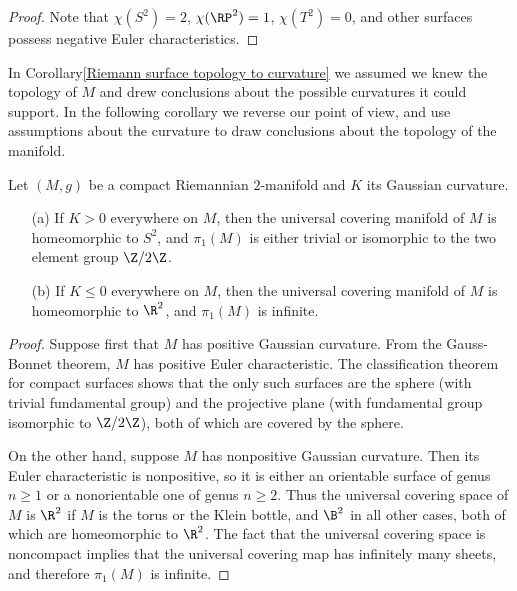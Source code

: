 \begin{proof}
Note that $\chi(S^2)=2$, $\chi(\RP^2)=1$, $\chi(T^2)=0$, and other surfaces possess negative Euler characteristics.
\end{proof}
In Corollary\ref{Riemann surface topology to curvature} we assumed we knew the topology of $M$ and drew conclusions about the possible curvatures it could support. In the following corollary we reverse our 
point of view, and use assumptions about the curvature to draw conclusions about the topology of the manifold.
\begin{corollary}\label{Riemann surface curvature to topology}
Let $(M,g)$ be a compact Riemannian $2$-manifold and $K$ its Gaussian curvature.
\begin{itemize}
\item[(a)] If $K>0$ everywhere on $M$, then the universal covering manifold of $M$ is homeomorphic to $S^2$, and $\pi_1(M)$ is either trivial or isomorphic to the two element group $\Z/2\Z$.
\item[(b)] If $K\leq 0$ everywhere on $M$, then the universal covering manifold of $M$ is homeomorphic to $\R^2$, and $\pi_1(M)$ is infinite.
\end{itemize}
\end{corollary}
\begin{proof}
Suppose first that $M$ has positive Gaussian curvature. From the Gauss-Bonnet theorem, $M$ has positive Euler characteristic. The classification theorem for compact surfaces shows that the only such surfaces are the sphere (with trivial fundamental group) and the projective plane (with fundamental group isomorphic to $\Z/2\Z$), both of which are covered by the sphere.\par
On the other hand, suppose $M$ has nonpositive Gaussian curvature. Then its Euler characteristic is nonpositive, so it is either an orientable surface of genus $n\geq 1$ or a nonorientable one of genus $n\geq 2$. Thus the universal covering space of $M$ is $\R^2$ if $M$ is the torus or the Klein bottle, and $\B^2$ in all other cases, both of which are homeomorphic to $\R^2$. The fact that the universal covering space is noncompact implies that the universal covering map has infinitely many sheets, and therefore $\pi_1(M)$ is infinite.
\end{proof}
